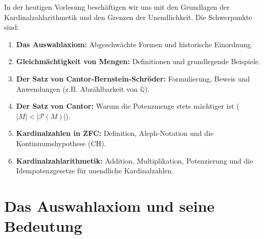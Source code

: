 


\begin{nice-box}
In der heutigen Vorlesung beschäftigen wir uns mit den Grundlagen der Kardinalzahlarithmetik und den Grenzen der Unendlichkeit. Die Schwerpunkte sind:
\begin{enumerate}[label=\textbf{\arabic*.}]
    \item \textbf{Das Auswahlaxiom:} Abgeschwächte Formen und historische Einordnung.
    \item \textbf{Gleichmächtigkeit von Mengen:} Definitionen und grundlegende Beispiele.
    \item \textbf{Der Satz von Cantor-Bernstein-Schröder:} Formulierung, Beweis und Anwendungen (z.B. Abzählbarkeit von $\mathbb{Q}$).
    \item \textbf{Der Satz von Cantor:} Warum die Potenzmenge stets mächtiger ist ($|M| < |\mathcal{P}(M)|$).
    \item \textbf{Kardinalzahlen in ZFC:} Definition, Aleph-Notation und die Kontinuumshypothese (CH).
    \item \textbf{Kardinalzahlarithmetik:} Addition, Multiplikation, Potenzierung und die Idempotenzgesetze für unendliche Kardinalzahlen.
\end{enumerate}
\end{nice-box}

\section{Das Auswahlaxiom und seine Bedeutung}

